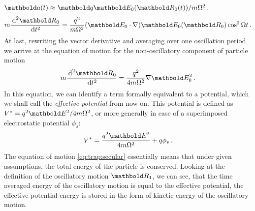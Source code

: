 $\mb a(t) \approx \mb q\mb E_0(\mb R_0(t))/m\Omega^2$.
\begin{equation}
m\frac{\de^2\mb R_0}{\de t^2} =
\frac{q^2}{m\Omega^2}(\mb E_0\cdot\nabla)\mb E_0(\mb R_0)\cos^2\Omega t\,.
\end{equation}
At last, rewriting the vector derivative and averaging over one
oscillation period we arrive at the equation of motion for the
non-oscillatory component of particle motion
\begin{equation}
m\frac{\de^2\mb R_0}{\de t^2} =
\frac{q^2}{4m\Omega^2}\nabla\mb E_0^2\,.
\label{eq:trap:secular}
\end{equation}
In this equation, we can identify a term formally equivalent
to a potential, which we shall call the {\em effective potential}
from now on. This potential is defined as
$V^* = {q^2\mb E^2}/{4m\Omega^2}$,
or more generally in case of a superimposed electrostatic potential
$\phi_s$:
\begin{equation}
V^* = \frac{q^2\mb E^2}{4m\Omega^2} + q\phi_s\,.
\end{equation}
The equation of motion \eqref{eq:trap:secular} essentially means
that under given assumptions, the total energy of the particle
is conserved. Looking at the definition of the oscillatory
motion $\mb R_1$, we can see, that the time averaged energy
of the oscillatory motion is equal to the effective potential, \ie
the effective potential energy is stored in the form of kinetic
energy of the oscillatory motion.

